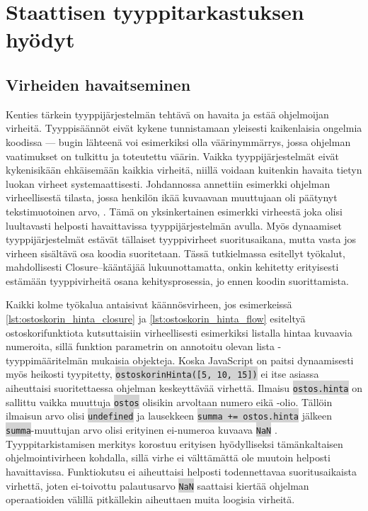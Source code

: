 \chapter{Staattisen tyyppitarkastuksen hyödyt}

\section{Virheiden havaitseminen}

Kenties tärkein tyyppijärjestelmän tehtävä on havaita ja estää
ohjelmoijan virheitä. Tyyppisäännöt eivät kykene tunnistamaan yleisesti
kaikenlaisia ongelmia koodissa — bugin lähteenä voi esimerkiksi olla
väärinymmärrys, jossa ohjelman vaatimukset on tulkittu ja toteutettu väärin.
Vaikka tyyppijärjestelmät eivät kykenisikään ehkäisemään kaikkia
virheitä, niillä voidaan kuitenkin havaita tietyn luokan virheet
systemaattisesti. Johdannossa annettiin esimerkki ohjelman virheellisestä
tilasta, jossa henkilön ikää kuvaavaan muuttujaan oli päätynyt tekstimuotoinen
arvo, . Tämä on yksinkertainen esimerkki virheestä joka
olisi luultavasti helposti havaittavissa tyyppijärjestelmän
avulla. Myös dynaamiset tyyppijärjestelmät estävät tällaiset tyyppivirheet
suoritusaikana, mutta vasta jos virheen sisältävä osa koodia suoritetaan.
Tässä tutkielmassa esitellyt työkalut, mahdollisesti Closure–kääntäjää
lukuunottamatta, onkin kehitetty erityisesti estämään tyyppivirheitä
osana kehitysprosessia, jo ennen koodin suorittamista.

Kaikki kolme työkalua antaisivat käännösvirheen, jos esimerkeissä
\ref{lst:ostoskorin_hinta_closure} ja \ref{lst:ostoskorin_hinta_flow}
esiteltyä ostoskorifunktiota kutsuttaisiin virheellisesti esimerkiksi listalla
hintaa kuvaavia numeroita, sillä funktion parametrin on annotoitu olevan
lista -tyyppimääritelmän mukaisia objekteja. Koska
JavaScript on paitsi dynaamisesti myös heikosti tyypitetty,\newline
\colorbox{lightgray}{\lstinline|ostoskorinHinta([5, 10, 15])|} ei itse
asiassa aiheuttaisi suoritettaessa ohjelman\newline
keskeyttävää virhettä. Ilmaisu 
\colorbox{lightgray}{\lstinline|ostos.hinta|} on sallittu vaikka
muuttuja \colorbox{lightgray}{\lstinline|ostos|} olisikin arvoltaan numero
eikä -olio. Tällöin ilmaisun arvo olisi \colorbox{lightgray}{\lstinline|undefined|}
ja lausekkeen \colorbox{lightgray}{\lstinline|summa += ostos.hinta|} jälkeen
\colorbox{lightgray}{\lstinline|summa|}-muuttujan arvo olisi erityinen
ei-numeroa kuvaava \colorbox{lightgray}{\lstinline|NaN|} \cite{Ecma262NaN}.
Tyyppitarkistamisen merkitys korostuu erityisen hyödylliseksi
tämänkaltaisen ohjelmointivirheen kohdalla, sillä virhe ei välttämättä ole
muutoin helposti havaittavissa. Funktiokutsu ei aiheuttaisi helposti
todennettavaa suoritusaikaista virhettä, joten ei-toivottu palautusarvo
\colorbox{lightgray}{\lstinline|NaN|} saattaisi kiertää ohjelman
operaatioiden välillä pitkällekin aiheuttaen muita loogisia virheitä.

